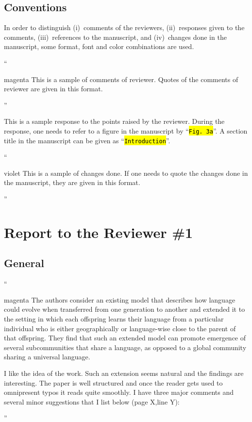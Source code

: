 \documentclass[10.5pt]{amsart}
\newcommand{\hbColorReviewer}{magenta}
\newcommand{\hbColorManuscript}{violet}
\newenvironment{hbReviewer}
	{\list{}{\leftmargin=2cm\rightmargin=1cm}\item[]``\begin{footnotesize}
	\begin{color}{\hbColorReviewer}}	
	{\end{color}\end{footnotesize}''\endlist}
\newcommand{\hbMRef}[1]{``\texttt{{\color{\hbColorManuscript}\hl{#1}}}''}
\newenvironment{hbChanged}
	{\list{}{\leftmargin=1cm\rightmargin=1.5cm}\item[]``\begin{small}
	\begin{color}{\hbColorManuscript}}	
	{\end{color}\end{small}''\endlist}
\newcommand{\hbMreffig}[1]{\hbMRef{Fig.~#1}}
\begin{document}
\subsection{Conventions}

\newcommand{\hbMSample}{\hbMRef{Introduction}}

In order to distinguish 
%
(i)~comments of the reviewers, 
%
(ii)~responses given to the comments, 
%
(iii)~references to the manuscript, and 
%
(iv)~changes done in the manuscript, 
some format, font and color combinations are used.

\begin{hbReviewer}
	This is a sample of comments of reviewer.
	Quotes of the comments of reviewer are given in this format.
\end{hbReviewer}

This is a sample response to the points raised by the reviewer.
During the response, 
one needs to refer to a figure in the manuscript by 
\hbMreffig{3a}.
A section title in the manuscript can be given as \hbMSample.

\begin{hbChanged}
	This is a sample of changes done.
	If one needs to quote the changes done in the manuscript,
	they are given in this format.
\end{hbChanged}





\section{Report to the Reviewer \#1}




\subsection{General}
\begin{hbReviewer}
	The authors consider an existing model that describes how language could
	evolve when transferred from one generation to another and extended it
	to the setting in which each offspring learns their language from a particular
	individual who is either geographically or language-wise close to the parent
	of that offspring. They find that such an extended model can promote
	emergence of several subcommunities that share a language, as opposed to
	a global community sharing a universal language.
	
	I like the idea of the work. Such an extension seems natural and the findings
	are interesting. The paper is well structured and once the reader gets used to
	omnipresent typos it reads quite smoothly. I have three major comments
	and several minor suggestions that I list below (page X,line Y):
\end{hbReviewer}
\end{document}
